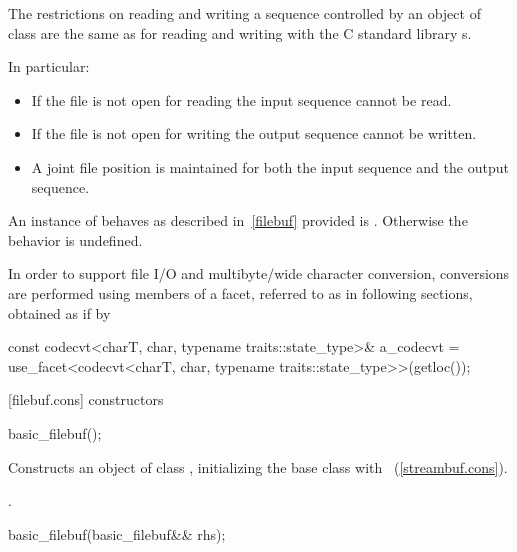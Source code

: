 \pnum
The restrictions on reading and writing a sequence controlled by an
object of class
are the same as for reading and writing with the C standard library
s.

\pnum
In particular:
\begin{itemize}
\item
If the file is not open for reading the input sequence
cannot be read.
\item
If the file is not open for writing the output
sequence cannot be written.
\item
A joint file position is maintained for both the input sequence and
the output sequence.
\end{itemize}

\pnum
An instance of
behaves as described in~\ref{filebuf} provided
is
.
Otherwise the behavior is undefined.

\pnum
In order to support file I/O and multibyte/wide character conversion,
conversions are performed using members of a facet, referred to as
 in following sections, obtained as if by

\begin{codeblock}
const codecvt<charT, char, typename traits::state_type>& a_codecvt =
  use_facet<codecvt<charT, char, typename traits::state_type>>(getloc());
\end{codeblock}

[filebuf.cons]{ constructors}

%
\begin{itemdecl}
basic_filebuf();
\end{itemdecl}

\begin{itemdescr}
\pnum
\effects
Constructs an object of class
,
initializing the base class with
~(\ref{streambuf.cons}).

\pnum
\postconditions
{}.
\end{itemdescr}

%
\begin{itemdecl}
basic_filebuf(basic_filebuf&& rhs);
\end{itemdecl}

